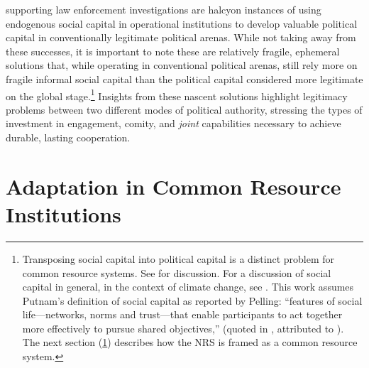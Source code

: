 \documentclass[12pt,journal,compsoc,letterpaper,onecolumn,twoside]{IEEEtran}
\begin{document}
supporting law enforcement investigations are halcyon instances of 
using endogenous social capital in operational institutions to 
develop valuable political capital in conventionally legitimate
political arenas.
%
While not taking away from these successes, it is important to note
these are relatively fragile, ephemeral solutions that, while
operating in conventional political arenas, still rely more on fragile informal
social capital than the political capital considered more legitimate
on the global stage.\footnote{Transposing social capital into
  political capital is a distinct problem for common resource
  systems.  See  for discussion.  For a
  discussion of social capital in general, in the context of climate
  change, see .  This work assumes
  Putnam's definition of social capital as reported by Pelling:
  ``features of social life---networks, norms and trust---that enable
  participants to act together more effectively to pursue shared
  objectives,'' (quoted in \cite[p. 310]{pelling2005understanding},
  attributed to ). The next section
  (\ref{sec:dissertation}) describes
  how the NRS is framed as a common resource system. }
%
Insights from these nascent solutions highlight 
legitimacy problems between two different modes of political
authority, stressing the types of investment in engagement, comity,
and \emph{joint} capabilities 
necessary to achieve durable, lasting cooperation.

\section{Adaptation in Common Resource Institutions} \label{sec:dissertation}
\end{document}
